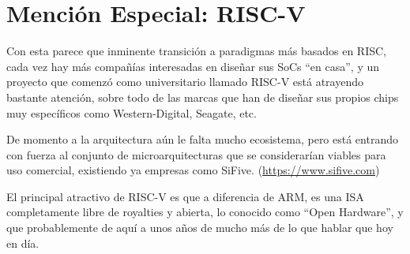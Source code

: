 \documentclass[a4paper,openright,12pt]{article}
\begin{document}
\section{Mención Especial: RISC-V}
Con esta parece que inminente transición a paradigmas más basados en RISC, cada vez hay más compañías interesadas en diseñar sus SoCs ``en casa'', y un proyecto que comenzó como universitario
llamado RISC-V está atrayendo bastante atención, sobre todo de las marcas que han de diseñar sus propios chips muy específicos como Western-Digital, Seagate, etc.

De momento a la arquitectura aún le falta mucho ecosistema, pero está entrando con fuerza al conjunto de microarquitecturas que se considerarían viables para uso comercial, existiendo ya
empresas como SiFive. (\url{https://www.sifive.com})

\bigskip

El principal atractivo de RISC-V es que a diferencia de ARM, es una ISA completamente libre de royalties y abierta, lo conocido como ``Open Hardware'', y que probablemente de aquí a unos
años de mucho más de lo que hablar que hoy en día.


\clearpage
\begin{flushleft}
\printbibliography[]{}
\end{flushleft}
\end{document}
